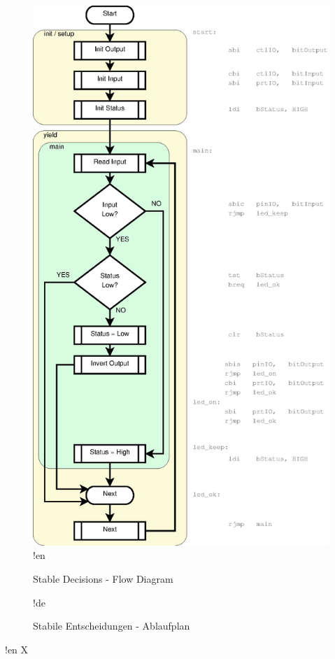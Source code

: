 \begin{figure}[htbp]
  \centering
  \includegraphics[height=0.95\textheight]{LED/S005_stable-decisions+symbols.eps}
!en   \caption{Stable Decisions - Flow Diagram}
!de   \caption{Stabile Entscheidungen - Ablaufplan}
  \label{S005FlowDiagam}
\end{figure}



!en X

